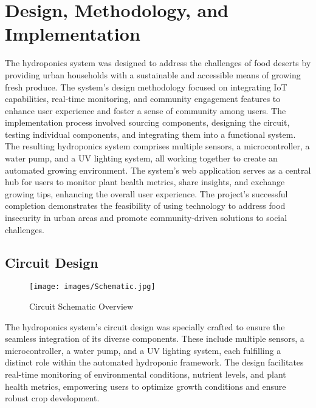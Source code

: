 \documentclass[12pt]{article} %
\newcommand{\comment}[1]{} %
\begin{document}
\comment {


\section*{Acknowledgment}
\addcontentsline{toc}{section}{Acknowledgment}
\lipsum[1] %

}

\pagebreak
\section{Design, Methodology, and Implementation}
\noindent The hydroponics system was designed to address the challenges of food deserts by providing urban households with a sustainable and accessible means of growing fresh produce. The system's design methodology focused on integrating IoT capabilities, real-time monitoring, and community engagement features to enhance user experience and foster a sense of community among users. The implementation process involved sourcing components, designing the circuit, testing individual components, and integrating them into a functional system. The resulting hydroponics system comprises multiple sensors, a microcontroller, a water pump, and a UV lighting system, all working together to create an automated growing environment. The system's web application serves as a central hub for users to monitor plant health metrics, share insights, and exchange growing tips, enhancing the overall user experience. The project's successful completion demonstrates the feasibility of using technology to address food insecurity in urban areas and promote community-driven solutions to social challenges.

\subsection{Circuit Design}
\noindent

\begin{figure}[H]
    \centering
    \texttt{[image: images/Schematic.jpg]}
    \caption{Circuit Schematic Overview}
    \label{fig:Schematic_Full}
\end{figure}

\noindent The hydroponics system's circuit design was specially crafted to ensure the seamless integration of its diverse components. These include multiple sensors, a microcontroller, a water pump, and a UV lighting system, each fulfilling a distinct role within the automated hydroponic framework. The design facilitates real-time monitoring of environmental conditions, nutrient levels, and plant health metrics, empowering users to optimize growth conditions and ensure robust crop development.
\newline
\newline
\end{document}
